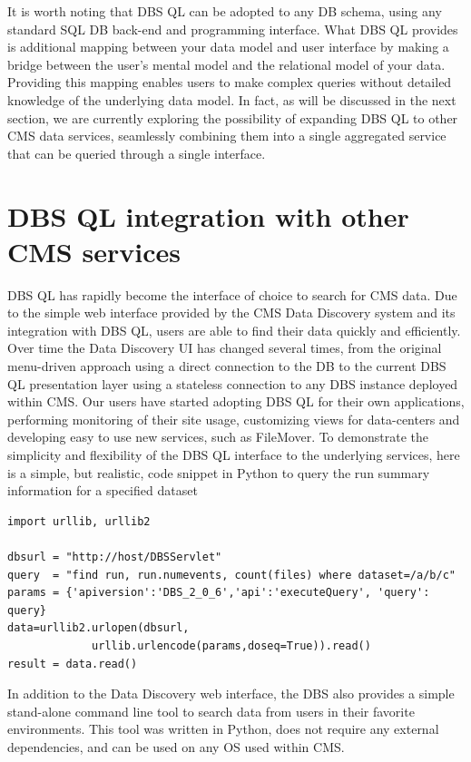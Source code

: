 \documentclass[a4paper]{jpconf}
\begin{document}
It is worth noting that DBS QL can be adopted to
any DB schema, using any standard SQL DB back-end and programming interface.
What DBS QL provides is additional mapping between your data model and
user interface by making a bridge between the user's mental model
and the relational model of your data. Providing this mapping enables
users to make complex queries without detailed knowledge of
the underlying data model. 
In fact, as will be discussed in the
next section, we are currently exploring the possibility of
expanding DBS QL to other CMS data services, seamlessly combining them
into a single aggregated service that can be queried through a single interface.

\section{DBS QL integration with other CMS services}

DBS QL has rapidly become the interface of choice to search for
CMS data. Due to the simple web interface provided by the CMS
Data Discovery\cite{DD} system and its integration with DBS QL,
users are able to find their data quickly and
efficiently. Over time the Data Discovery UI has
changed several times, from the original menu-driven approach using
a direct connection to the DB to the current DBS QL presentation layer
using a stateless connection to any DBS instance deployed
within CMS. Our users have started adopting DBS QL for their
own applications, performing monitoring of their
site usage, customizing views for data-centers
and developing easy to use new services, such as
FileMover\cite{FileMover}. To demonstrate the simplicity and
flexibility of the DBS QL interface to the underlying services,
here is a simple, but realistic,
code snippet in Python to query the run summary information
for a specified dataset
\begin{verbatim}
import urllib, urllib2

dbsurl = "http://host/DBSServlet"
query  = "find run, run.numevents, count(files) where dataset=/a/b/c"
params = {'apiversion':'DBS_2_0_6','api':'executeQuery', 'query': query} 
data=urllib2.urlopen(dbsurl,
             urllib.urlencode(params,doseq=True)).read()
result = data.read()
\end{verbatim}
In addition to the Data Discovery web interface, the DBS also
provides a simple stand-alone command line tool
to search data from users in their
favorite environments. This tool was written
in Python, does not require any external dependencies, and can
be used on any OS used within CMS.
\end{document}
